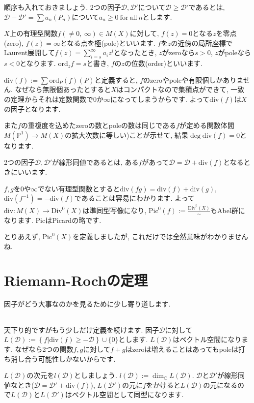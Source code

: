 \documentclass{jsarticle}
\def\Pic{\mathrm{Pic}}
\def\Div{\mathrm{Div}}
\def\div{\mathrm{div}}
\def\ord{\mathrm{ord}}
\theoremstyle{definition}
\numberwithin{theorem}{section}
\begin{document}
順序も入れておきましょう. 2つの因子$\mathcal{D}, \mathcal{D}'$について$\mathcal{D} \geq \mathcal{D}'$であるとは, $\mathcal{D} - \mathcal{D}' = \sum a_n(P_n)$について$a_n \geq 0 \mathrm{\ for\ all\ } n$とします.

$X$上の有理型関数$f(\neq 0,\ \infty) \in M(X)$に対して, $f(z) = 0$となる$z$を零点(zero), $f(z) = \infty$となる点を極(pole)といいます. $f$を$z$の近傍の局所座標でLaurent展開して$f(z) = \sum_{i=s}^\infty a_iz^i$となったとき, $z$がzeroなら$s > 0$, $z$がpoleなら$s < 0$となります. $\ord_z f = s$と書き, $f$の$z$の位数(order)といいます. 

$\div(f) := \sum \ord_P(f) (P)$と定義すると, $f$のzeroやpoleや有限個しかありません. なぜなら無限個あったとすると$X$はコンパクトなので集積点ができて, 一致の定理からそれは定数関数で0か$\infty$になってしまうからです. よって$\div(f)$は$X$の因子となります. 

また$f$の重複度を込めたzeroの数とpoleの数は同じである$f$が定める関数体間$M(\mathbb{P}^1) \rightarrow M(X)$の拡大次数に等しい)ことが示せて, 結果$\deg \div(f) = 0$となります. 

2つの因子$\mathcal{D}, \mathcal{D}'$が線形同値であるとは, ある$f$があって$\mathcal{D} = \mathcal{D} + \div(f)$となるときにいいます.

$f, g$を0や$\infty$でない有理型関数とすると$\div(fg) = \div(f) + \div(g)$, $\div(f^{-1}) = -\div(f)$であることは容易にわかります. よって $\div: M(X) \rightarrow \Div^0(X)$は準同型写像になり, $\Pic^0(f) := \frac{\Div^0(X)}{\sim}$もAbel群になります. $\Pic$はPicardの略です. 

とりあえず, $\Pic^0(X)$を定義しましたが, これだけでは全然意味がわかりませんね.

\section{Riemann-Rochの定理}
因子がどう大事なのかを見るために少し寄り道します.

\hrulefill\\

天下り的ですがもう少しだけ定義を続けます. 因子$\mathcal{D}$に対して$L(\mathcal{D}) := \left\{f | \div(f) \geq -\mathcal{D}\right\} \cup \{0\}$とします. $L(\mathcal{D})$はベクトル空間になります. なぜなら2つの関数$f, g$に対して$f+g$はzeroは増えることはあってもpoleは打ち消し合う可能性しかないからです.

$L(\mathcal{D})$の次元を$l(\mathcal{D})$としましょう. $l(\mathcal{D}) := \dim_\mathbb{C} L(\mathcal{D})$. $\mathcal{D}$と$\mathcal{D}'$が線形同値なとき($\mathcal{D} = \mathcal{D}' + \div(f)$), $L(\mathcal{D}')$の元に$f$をかけると$L(\mathcal{D})$の元になるので$L(\mathcal{D})$と$L(\mathcal{D}')$はベクトル空間として同型になります. 
\end{document}
